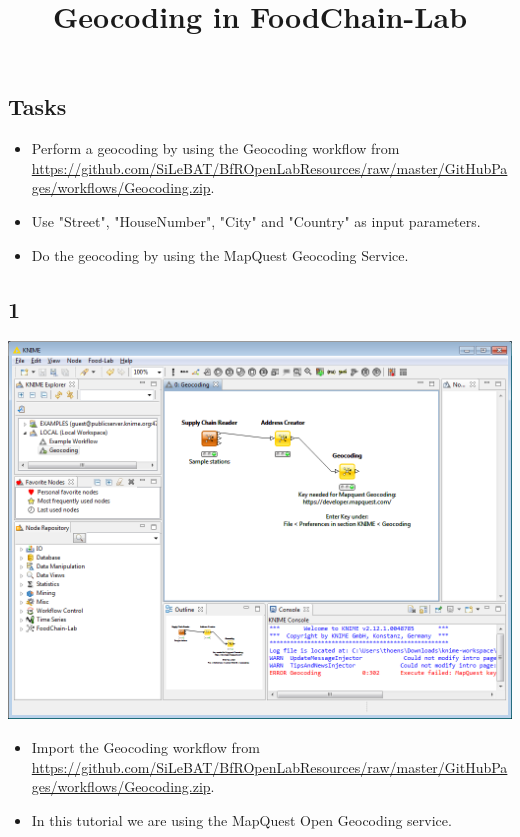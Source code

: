 \documentclass{beamer}
\title{Geocoding in FoodChain-Lab}
\date{}
\begin{document}
\maketitle

\section{ }

\subsection{Tasks}
\begin{frame}
	\begin{itemize}
		\item Perform a geocoding by using the Geocoding workflow from \url{https://github.com/SiLeBAT/BfROpenLabResources/raw/master/GitHubPages/workflows/Geocoding.zip}.
		\item Use "Street", "HouseNumber", "City" and "Country" as input parameters.
		\item Do the geocoding by using the MapQuest Geocoding Service.
	\end{itemize}
\end{frame}
 
\subsection{1}
\begin{frame}
	\begin{center}
  		\includegraphics[height=0.6\textheight]{1.png}
	\end{center}
	\begin{itemize}
		\item Import the Geocoding workflow from \url{https://github.com/SiLeBAT/BfROpenLabResources/raw/master/GitHubPages/workflows/Geocoding.zip}.
		\item In this tutorial we are using the MapQuest Open Geocoding service.
	\end{itemize}
\end{frame}
\end{document}

